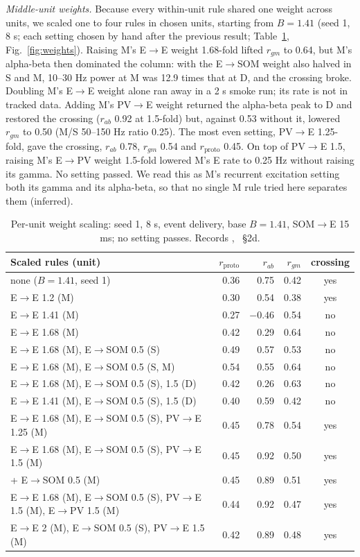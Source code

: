 \textit{Middle-unit weights.} Because every within-unit rule shared one weight across units, we scaled one to four
rules in chosen units, starting from $B = 1.41$ (seed 1, 8 s; each setting chosen by hand after the previous
result; Table~\ref{tab:weights}, Fig.~\ref{fig:weights}). Raising M's E$\to$E
weight 1.68-fold lifted $r_{gm}$ to 0.64, but M's alpha-beta then dominated the column: with the E$\to$SOM weight
also halved in S and M, 10--30 Hz power at M was 12.9 times that at D, and the crossing
broke. Doubling M's E$\to$E weight alone ran away in a 2 s smoke run; its rate is not in tracked data. Adding M's PV$\to$E weight returned
the alpha-beta peak to D and restored the crossing ($r_{ab}$ 0.92 at 1.5-fold) but, against 0.53 without it, lowered $r_{gm}$ to 0.50 (M/S 50--150 Hz ratio 0.25). The most even setting, PV$\to$E 1.25-fold, gave the crossing, $r_{ab}$ 0.78, $r_{gm}$
0.54 and $r_\text{proto}$ 0.45. On top of PV$\to$E 1.5, raising M's E$\to$PV weight 1.5-fold lowered M's E rate to
0.25 Hz without raising its gamma. No setting passed. We read this as M's recurrent excitation setting both its
gamma and its alpha-beta, so that no single M rule tried here separates them (inferred).

\begin{table}[tbp]
\centering
\small
\begin{tabular}{lrrrc}
\toprule
Scaled rules (unit) & $r_\text{proto}$ & $r_{ab}$ & $r_{gm}$ & crossing \\
\midrule
none ($B = 1.41$, seed 1) & 0.36 & 0.75 & 0.42 & yes \\
E$\to$E 1.2 (M) & 0.30 & 0.54 & 0.38 & yes \\
E$\to$E 1.41 (M) & 0.27 & $-0.46$ & 0.54 & no \\
E$\to$E 1.68 (M) & 0.42 & 0.29 & 0.64 & no \\
E$\to$E 1.68 (M), E$\to$SOM 0.5 (S) & 0.49 & 0.57 & 0.53 & no \\
E$\to$E 1.68 (M), E$\to$SOM 0.5 (S, M) & 0.54 & 0.55 & 0.64 & no \\
E$\to$E 1.68 (M), E$\to$SOM 0.5 (S), 1.5 (D) & 0.42 & 0.26 & 0.63 & no \\
E$\to$E 1.41 (M), E$\to$SOM 0.5 (S), 1.5 (D) & 0.40 & 0.59 & 0.42 & no \\
E$\to$E 1.68 (M), E$\to$SOM 0.5 (S), PV$\to$E 1.25 (M) & 0.45 & 0.78 & 0.54 & yes \\
E$\to$E 1.68 (M), E$\to$SOM 0.5 (S), PV$\to$E 1.5 (M) & 0.45 & 0.92 & 0.50 & yes \\
\quad + E$\to$SOM 0.5 (M) & 0.45 & 0.89 & 0.51 & yes \\
E$\to$E 1.68 (M), E$\to$SOM 0.5 (S), PV$\to$E 1.5 (M), E$\to$PV 1.5 (M) & 0.44 & 0.92 & 0.47 & yes \\
E$\to$E 2 (M), E$\to$SOM 0.5 (S), PV$\to$E 1.5 (M) & 0.42 & 0.89 & 0.48 & yes \\
\bottomrule
\end{tabular}
\caption{Per-unit weight scaling: seed 1, 8 s, event delivery, base $B = 1.41$, SOM$\to$E 15 ms; no
setting passes. Records , ~\S2d.}
\label{tab:weights}
\end{table}

